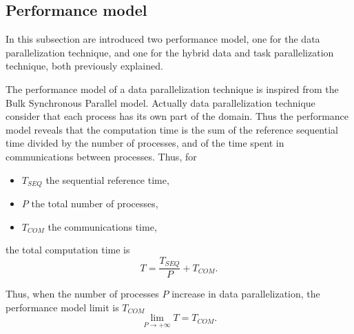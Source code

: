 \subsection{Performance model}
\label{sect:perfs}

In this subsection are introduced two performance model, one for the data parallelization technique, and one for the hybrid data and task parallelization technique, both previously explained.

The performance model of a data parallelization technique is inspired from the Bulk Synchronous Parallel model. Actually data parallelization technique consider that each process has its own part of the domain. Thus the performance model reveals that the computation time is the sum of the reference sequential time divided by the number of processes, and of the time spent in communications between processes. Thus, for
\begin{itemize}
\item $T_{SEQ}$ the sequential reference time, 
\item $P$ the total number of processes, 
\item $T_{COM}$ the communications time, 
\end{itemize}
the total computation time is
\begin{equation}
T = \frac{T_{SEQ}}{P} + T_{COM}.
\end{equation}


Thus, when the number of processes $P$ increase in data parallelization, the performance model limit is $T_{COM}$
\begin{equation}
\lim\limits_{P \rightarrow +\infty} T = T_{COM}.
\end{equation}

